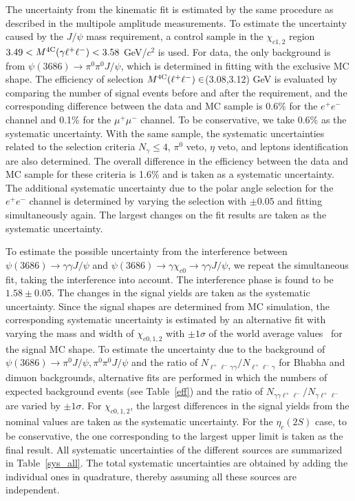 \documentclass[prd,twocolumn,showpacs,amsmath,amssymb]{revtex4-1}
\begin{document}
The uncertainty from the kinematic fit is estimated by the same procedure as described in the multipole amplitude measurements.
To estimate the uncertainty caused by the $J/\psi$ mass requirement, a control sample in the
$\chi_{c1,2}$ region $3.49 < M^{4\rm C}(\gamma \ell^+\ell^-) < 3.58$ GeV/$c^{2}$ is used. For data, the only background is from $\psi(3686)\to\pi^0\pi^0J/\psi$, which is determined in fitting with the exclusive MC shape. The efficiency of selection $M^{\rm 4C}(\ell^+\ell^-)\in$(3.08,3.12) GeV is evaluated by comparing the number of signal events before and after the requirement, and the corresponding difference between the data and MC sample is 0.6\% for the $e^{+}e^{-}$ channel and 0.1\% for the $\mu^{+}\mu^{-}$ channel. To be conservative, we take 0.6\% as the systematic uncertainty.
With the same sample, the systematic uncertainties related to the selection
criteria $N_{\gamma} \leq 4$, $\pi^{0}$ veto, $\eta$ veto, and leptons identification are also determined. The overall difference in the efficiency between the
data and MC sample for these criteria is 1.6\% and is taken as a systematic uncertainty. The additional systematic uncertainty due to the polar angle selection for the $e^+e^-$ channel is determined by varying the selection with $\pm0.05$ and fitting simultaneously again. The largest changes on the fit results are taken as the systematic uncertainty.

To estimate the possible uncertainty from the interference between $\psi(3686)\to\gamma \gamma J/\psi$ and $\psi(3686)\to\gamma \chi_{c0}\to\gamma\gamma J/\psi$, we repeat the simultaneous fit, taking the interference into account.  The interference phase is found to be $1.58\pm0.05$. The changes in the signal yields are taken as the systematic uncertainty. Since the signal shapes are determined from MC simulation, the corresponding systematic uncertainty is estimated by an alternative fit with
varying the mass and width of $\chi_{c0,1,2}$ with $\pm 1\sigma$ of the world average values~\cite{PDG} for the signal MC shape.
To estimate the uncertainty due to the background of $\psi(3686)\to\pi^{0}J/\psi, \pi^{0}\pi^{0}J/\psi$ and the ratio
of $N_{\ell^{+}\ell^{-}\gamma\gamma}/N_{\ell^{+}\ell^{-}\gamma}$ for Bhabha and dimuon backgrounds, alternative fits are performed in which the numbers of expected background events (see Table~\ref{eff}) and the ratio of $N_{\gamma\gamma \ell^+\ell^-}/N_{\gamma \ell^+\ell^-}$ are varied by $\pm 1\sigma$. For $\chi_{c0,1,2}$, the largest differences in the signal yields from the nominal values are taken as the systematic uncertainty.
For the $\eta_c(2S)$ case, to be conservative, the one corresponding to the largest upper limit is taken as the final result.
All systematic uncertainties of the different sources are summarized in Table~\ref{sys_all}.
The total systematic uncertainties are obtained by adding the individual ones in quadrature, thereby assuming all these sources are independent.
\end{document}
